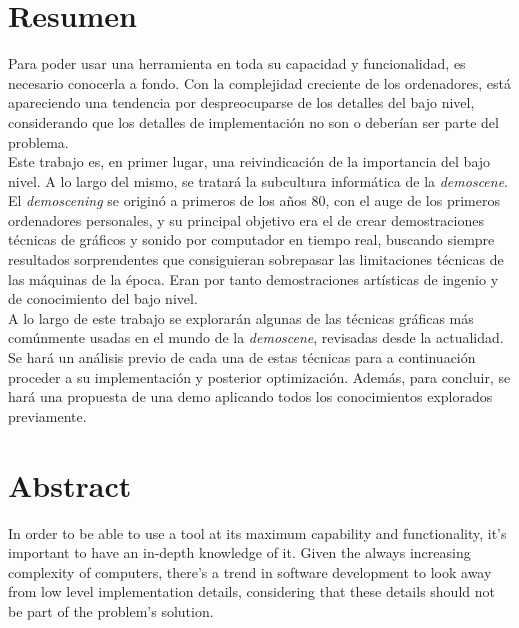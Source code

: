 
\chapter*{Resumen}

Para poder usar una herramienta en toda su capacidad y funcionalidad, es necesario conocerla a fondo. Con la complejidad creciente de los ordenadores, está apareciendo una tendencia por despreocuparse de los detalles del bajo nivel, considerando que los detalles de implementación no son o deberían ser parte del problema.\\

Este trabajo es, en primer lugar, una reivindicación de la importancia del bajo nivel. A lo largo del mismo, se tratará la subcultura informática de la \emph{demoscene}.\\

El \emph{demoscening} se originó a primeros de los años 80, con el auge de los primeros ordenadores personales, y su principal objetivo era el de crear demostraciones técnicas de gráficos y sonido por computador en tiempo real, buscando siempre resultados sorprendentes que consiguieran sobrepasar las limitaciones técnicas de las máquinas de la época. Eran por tanto demostraciones artísticas de ingenio y de conocimiento del bajo nivel.\\

A lo largo de este trabajo se explorarán algunas de las técnicas gráficas más comúnmente usadas en el mundo de la \emph{demoscene}, revisadas desde la actualidad. Se hará un análisis previo de cada una de estas técnicas para a continuación proceder a su implementación y posterior optimización.
Además, para concluir, se hará una propuesta de una demo aplicando todos los conocimientos explorados previamente.

\chapter*{Abstract}
In order to be able to use a tool at its maximum capability and functionality, it's important to have an in-depth knowledge of it. Given the always increasing complexity of computers, there's a trend in software development to look away from low level implementation details, considering that these details should not be part of the problem's solution.\\


